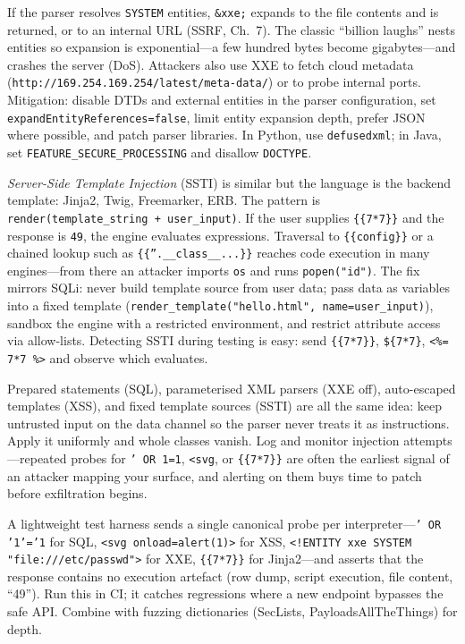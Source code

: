 If the parser resolves \texttt{SYSTEM} entities, \texttt{\&xxe;} expands to the file contents and is returned, or to an internal URL (SSRF, Ch.~7). The classic ``billion laughs'' nests entities so expansion is exponential---a few hundred bytes become gigabytes---and crashes the server (DoS). Attackers also use XXE to fetch cloud metadata (\texttt{http://169.254.169.254/latest/meta-data/}) or to probe internal ports. Mitigation: disable DTDs and external entities in the parser configuration, set \texttt{expandEntityReferences=false}, limit entity expansion depth, prefer JSON where possible, and patch parser libraries. In Python, use \texttt{defusedxml}; in Java, set \texttt{FEATURE\_SECURE\_PROCESSING} and disallow \texttt{DOCTYPE}.

\emph{Server-Side Template Injection} (SSTI) is similar but the language is the backend template: Jinja2, Twig, Freemarker, ERB. The pattern is \texttt{render(template\_string + user\_input)}. If the user supplies \texttt{\{\{7*7\}\}} and the response is \texttt{49}, the engine evaluates expressions. Traversal to \texttt{\{\{config\}\}} or a chained lookup such as \texttt{\{\{''.\_\_class\_\_...\}\}} reaches code execution in many engines---from there an attacker imports \texttt{os} and runs \texttt{popen("id")}. The fix mirrors SQLi: never build template source from user data; pass data as variables into a fixed template (\texttt{render\_template("hello.html", name=user\_input)}), sandbox the engine with a restricted environment, and restrict attribute access via allow-lists. Detecting SSTI during testing is easy: send \texttt{\{\{7*7\}\}}, \texttt{\$\{7*7\}}, \texttt{<\%= 7*7 \%>} and observe which evaluates.

\begin{remark}
Prepared statements (SQL), parameterised XML parsers (XXE off), auto-escaped templates (XSS), and fixed template sources (SSTI) are all the same idea: keep untrusted input on the data channel so the parser never treats it as instructions. Apply it uniformly and whole classes vanish. Log and monitor injection attempts---repeated probes for \texttt{' OR 1=1}, \texttt{<svg}, or \texttt{\{\{7*7\}\}} are often the earliest signal of an attacker mapping your surface, and alerting on them buys time to patch before exfiltration begins.
\end{remark}

\begin{example}
A lightweight test harness sends a single canonical probe per interpreter---\texttt{' OR '1'='1} for SQL, \texttt{<svg onload=alert(1)>} for XSS, \texttt{<!ENTITY xxe SYSTEM "file:///etc/passwd">} for XXE, \texttt{\{\{7*7\}\}} for Jinja2---and asserts that the response contains no execution artefact (row dump, script execution, file content, ``49''). Run this in CI; it catches regressions where a new endpoint bypasses the safe API. Combine with fuzzing dictionaries (SecLists, PayloadsAllTheThings) for depth.
\end{example}


